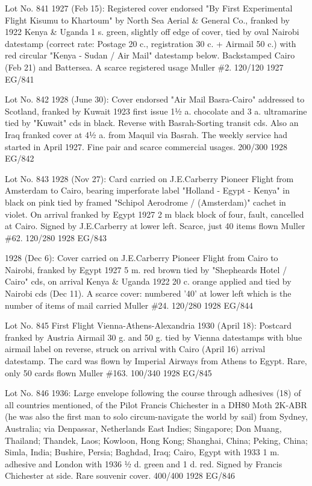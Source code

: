 \documentclass[justified]{tufte-book}
\begin{document}
%
{Lot No. 841
1927 (Feb 15): Registered cover endorsed "By First Experimental Flight Kisumu to Khartoum" by North Sea Aerial \& General Co., franked by 1922 Kenya \& Uganda 1 s. green, slightly off edge of cover, tied by oval Nairobi datestamp (correct rate: Postage 20 c., registration 30 c. + Airmail 50 c.) with red circular "Kenya - Sudan / Air Mail" datestamp below. Backstamped Cairo (Feb 21) and Battersea. A scarce registered usage Muller \#2. 120/120}%
{1927}%
{EG/841}%
{}%
{}
{}%
{}

%
{Lot No. 842
1928 (June 30): Cover endorsed "Air Mail Basra-Cairo" addressed to Scotland, franked by Kuwait 1923 first issue 1½ a. chocolate and 3 a. ultramarine tied by "Kuwait" cds in black. Reverse with Basrah-Sorting transit cds. Also an Iraq franked cover at 4½ a. from Maquil via Basrah. The weekly service had started in April 1927. Fine pair and scarce commercial usages. 200/300}%
{1928}%
{EG/842}%
{}%
{}
{}%
{}



%
{Lot No. 843
1928 (Nov 27): Card carried on J.E.Carberry Pioneer Flight from Amsterdam to Cairo, bearing imperforate label "Holland - Egypt - Kenya" in black on pink tied by framed "Schipol Aerodrome / (Amsterdam)" cachet in violet. On arrival franked by Egypt 1927 2 m black block of four, fault, cancelled at Cairo. Signed by J.E.Carberry at lower left. Scarce, just 40 items flown Muller \#62. 120/280}%
{1928}%
{EG/843}%
{}%
{}
{}%
{}

%
{1928 (Dec 6): Cover carried on J.E.Carberry Pioneer Flight from Cairo to Nairobi, franked by Egypt 1927 5 m. red brown tied by "Shepheards Hotel / Cairo" cds, on arrival Kenya \& Uganda 1922 20 c. orange applied and tied by Nairobi cds (Dec 11). A scarce cover: numbered '40' at lower left which is the number of items of mail carried Muller \#24. 120/280}%
{1928}%
{EG/844}%
{}%
{}
{}%
{}

%
{Lot No. 845
First Flight Vienna-Athens-Alexandria 1930 (April 18): Postcard franked by Austria Airmail 30 g. and 50 g. tied by Vienna datestamps with blue airmail label on reverse, struck on arrival with Cairo (April 16) arrival datestamp. The card was flown by Imperial Airways from Athens to Egypt. Rare, only 50 cards flown Muller \#163. 100/340}%
{1928}%
{EG/845}%
{}%
{}
{}%
{}

%
{Lot No. 846
1936: Large envelope following the course through adhesives (18) of all countries mentioned, of the Pilot Francis Chichester in a DH80 Moth 2K-ABR (he was also the first man to solo circum-navigate the world by sail) from Sydney, Australia; via Denpassar, Netherlands East Indies; Singapore; Don Muang, Thailand; Thandek, Laos; Kowloon, Hong Kong; Shanghai, China; Peking, China; Simla, India; Bushire, Persia; Baghdad, Iraq; Cairo, Egypt with 1933 1 m. adhesive and London with 1936 ½ d. green and 1 d. red. Signed by Francis Chichester at side. Rare souvenir cover. 400/400}%
{1928}%
{EG/846}%
{}%
{}
{}%
{}
\end{document}
